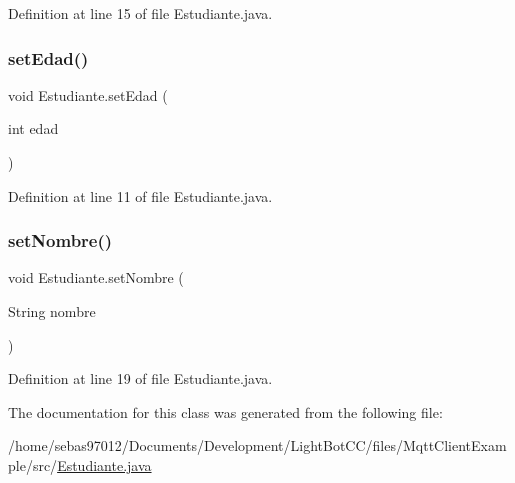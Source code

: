 Definition at line 15 of file Estudiante.\+java.

\mbox{\label{class_estudiante_a52a02fb5162fd2d124270d071b309660}} 
\subsubsection{\texorpdfstring{set\+Edad()}{setEdad()}}
{\footnotesize\ttfamily void Estudiante.\+set\+Edad (\begin{DoxyParamCaption}\item[{int}]{edad }\end{DoxyParamCaption})\hspace{0.3cm}{\ttfamily [inline]}}



Definition at line 11 of file Estudiante.\+java.

\mbox{\label{class_estudiante_aa8a4d05708647b2b143cb444bcb5b52c}} 
\subsubsection{\texorpdfstring{set\+Nombre()}{setNombre()}}
{\footnotesize\ttfamily void Estudiante.\+set\+Nombre (\begin{DoxyParamCaption}\item[{String}]{nombre }\end{DoxyParamCaption})\hspace{0.3cm}{\ttfamily [inline]}}



Definition at line 19 of file Estudiante.\+java.



The documentation for this class was generated from the following file\+:\begin{DoxyCompactItemize}
\item 
/home/sebas97012/\+Documents/\+Development/\+Light\+Bot\+C\+C/files/\+Mqtt\+Client\+Example/src/\mbox{\hyperlink{_estudiante_8java}{Estudiante.\+java}}\end{DoxyCompactItemize}
